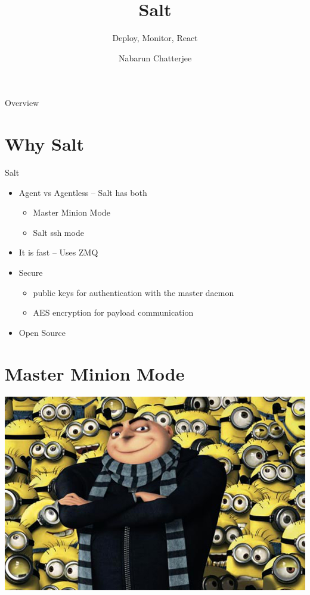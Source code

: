 \documentclass[pdf]{beamer}
\title{Salt}
\subtitle{Deploy, Monitor, React}
\author{Nabarun Chatterjee}
\begin{document}
	\begin{frame}
		\titlepage
	\end{frame}

	\begin{frame}{Overview}
		\tableofcontents
	\end{frame}

	\section{Why Salt}
	\begin{frame}{Salt}
		\begin{itemize}
			\item Agent vs Agentless
			\pause
			--  Salt has both
			\begin{itemize}
				\pause
				\item Master Minion Mode
				\pause
				\item Salt ssh mode
			\end{itemize}
			\pause
			\item It is fast
			\pause
			-- Uses ZMQ
			\pause
			\item Secure
			\begin{itemize}
				\pause
				\item public keys for authentication with the master daemon
				\pause
				\item AES encryption for payload communication
			\end{itemize}
			\pause
			\item Open Source
		\end{itemize}
	\end{frame}
	\section{Master Minion Mode}
	\begin{frame}
		\includegraphics[scale=0.4]{gru.jpg}
	\end{frame}
\end{document}
